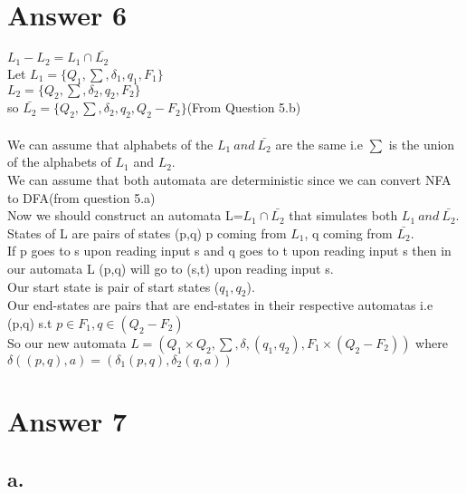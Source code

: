 \documentclass[12pt]{article}
\begin{document}
\section*{Answer 6}

$L_1 -  L_2 = L_1 \cap \bar{L_2}$
\\
Let $L_1= \{ Q_1, \sum, \delta_1, q_1,F_1 \}$
\\
$L_2=\{  Q_2,\sum, \delta_2, q_2, F_2 \}$
\\
so $\bar{L_2}=\{  Q_2,\sum, \delta_2, q_2,Q_2-  F_2 \}$(From Question 5.b)
\\
\\
We can assume that alphabets of the $L_1 \ and \ \bar{L_2}$ are the same i.e $\sum$ is the union of the alphabets of $L_1$ and $L_2$.
\\
We can assume that both automata are deterministic since we can convert NFA to DFA(from question 5.a)
\\
Now we should construct an automata L=$ L_1 \cap \bar{L_2}$ that simulates both $L_1 \ and \ \bar{L_2}$.
\\
States of L are pairs of states (p,q) p coming from $L_1$, q coming from $\bar{L_2}$.
\\
If p goes to s upon reading input s and q goes to t upon reading input s then in our automata L (p,q) will go to (s,t) upon reading input s.
\\
Our start state is pair of start states ($q_1,q_2$).
\\
Our end-states are pairs that are end-states in their respective automatas i.e (p,q) s.t $p \in F_1, q\in (Q_2 - F_2)$ 
\\
So our new automata $L=(Q_1 \times Q_2, \sum, \delta, (q_1,q_2), F_1 \times (Q_2 - F_2))$ where $\delta((p,q),a)= (\delta_1(p,q),\delta_2(q,a))$


\section*{Answer 7}

\subsection*{a.}
\end{document}
